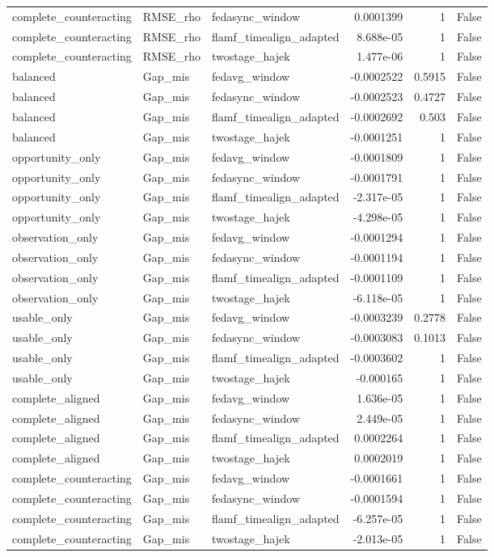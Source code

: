 \begin{table}
\begin{tabular}{lllrrr}
complete_counteracting & RMSE_rho & fedasync_window & 0.0001399 & 1 & False \\
complete_counteracting & RMSE_rho & flamf_timealign_adapted & 8.688e-05 & 1 & False \\
complete_counteracting & RMSE_rho & twostage_hajek & 1.477e-06 & 1 & False \\
balanced & Gap_mis & fedavg_window & -0.0002522 & 0.5915 & False \\
balanced & Gap_mis & fedasync_window & -0.0002523 & 0.4727 & False \\
balanced & Gap_mis & flamf_timealign_adapted & -0.0002692 & 0.503 & False \\
balanced & Gap_mis & twostage_hajek & -0.0001251 & 1 & False \\
opportunity_only & Gap_mis & fedavg_window & -0.0001809 & 1 & False \\
opportunity_only & Gap_mis & fedasync_window & -0.0001791 & 1 & False \\
opportunity_only & Gap_mis & flamf_timealign_adapted & -2.317e-05 & 1 & False \\
opportunity_only & Gap_mis & twostage_hajek & -4.298e-05 & 1 & False \\
observation_only & Gap_mis & fedavg_window & -0.0001294 & 1 & False \\
observation_only & Gap_mis & fedasync_window & -0.0001194 & 1 & False \\
observation_only & Gap_mis & flamf_timealign_adapted & -0.0001109 & 1 & False \\
observation_only & Gap_mis & twostage_hajek & -6.118e-05 & 1 & False \\
usable_only & Gap_mis & fedavg_window & -0.0003239 & 0.2778 & False \\
usable_only & Gap_mis & fedasync_window & -0.0003083 & 0.1013 & False \\
usable_only & Gap_mis & flamf_timealign_adapted & -0.0003602 & 1 & False \\
usable_only & Gap_mis & twostage_hajek & -0.000165 & 1 & False \\
complete_aligned & Gap_mis & fedavg_window & 1.636e-05 & 1 & False \\
complete_aligned & Gap_mis & fedasync_window & 2.449e-05 & 1 & False \\
complete_aligned & Gap_mis & flamf_timealign_adapted & 0.0002264 & 1 & False \\
complete_aligned & Gap_mis & twostage_hajek & 0.0002019 & 1 & False \\
complete_counteracting & Gap_mis & fedavg_window & -0.0001661 & 1 & False \\
complete_counteracting & Gap_mis & fedasync_window & -0.0001594 & 1 & False \\
complete_counteracting & Gap_mis & flamf_timealign_adapted & -6.257e-05 & 1 & False \\
complete_counteracting & Gap_mis & twostage_hajek & -2.013e-05 & 1 & False \\
\bottomrule
\end{tabular}
\end{table}
